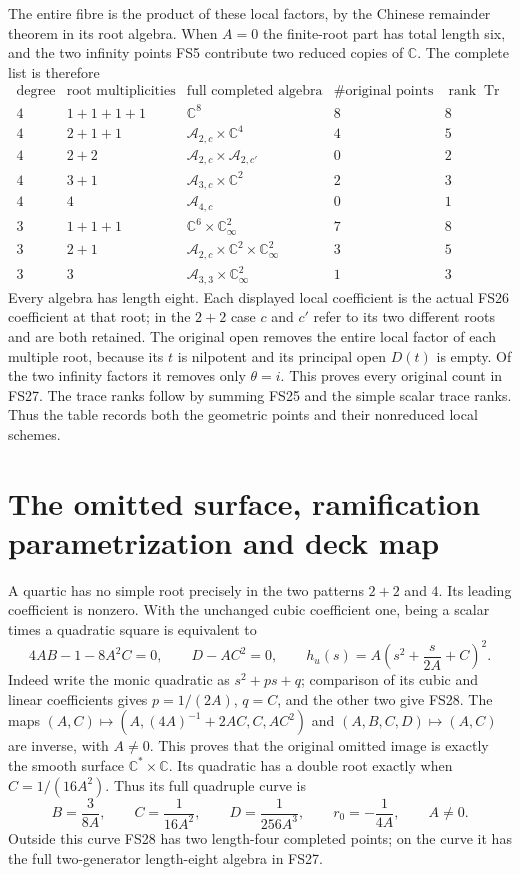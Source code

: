 \documentclass[11pt]{article}
\newcommand{\C}{\mathbb C}
\providecommand{\Tr}{\operatorname{Tr}}
\providecommand{\Tr}{\operatorname{Tr}}
\begin{document}
The entire fibre is the product of these local factors,
by the Chinese remainder theorem in its root algebra.
When $A=0$ the finite-root part has total length six,
and the two infinity points FS5 contribute two reduced
copies of $\C$. The complete list is therefore
\begin{equation}
\begin{array}{c|c|c|c|c}
\text{degree}&\text{root multiplicities}&\text{full completed algebra}
 &\#\text{original points}&\operatorname{rank}\Tr\\\hline
4&1+1+1+1&\C^8&8&8\\
4&2+1+1&\mathcal A_{2,c}\times\C^4&4&5\\
4&2+2&\mathcal A_{2,c}\times\mathcal A_{2,c'}&0&2\\
4&3+1&\mathcal A_{3,c}\times\C^2&2&3\\
4&4&\mathcal A_{4,c}&0&1\\\hline
3&1+1+1&\C^6\times\C^2_\infty&7&8\\
3&2+1&\mathcal A_{2,c}\times\C^2\times\C^2_\infty&3&5\\
3&3&\mathcal A_{3,3}\times\C^2_\infty&1&3
\end{array}
\tag{FS27}
\end{equation}
Every algebra has length eight. Each displayed local
coefficient is the actual FS26 coefficient at that root;
in the $2+2$ case $c$ and $c'$ refer to its two different
roots and are both retained. The original open removes
the entire local factor of each multiple root, because
its $t$ is nilpotent and its principal open $D(t)$ is
empty. Of the two infinity factors it removes only
$\theta=i$. This proves every original count in FS27.
The trace ranks follow by summing FS25 and the simple
scalar trace ranks. Thus the table records both the
geometric points and their nonreduced local schemes.

\section{The omitted surface, ramification parametrization and deck map}
A quartic has no simple root precisely in the two
patterns $2+2$ and $4$. Its leading coefficient is
nonzero. With the unchanged cubic coefficient one,
being a scalar times a quadratic square is equivalent to
\begin{equation}
4AB-1-8A^2C=0,\qquad D-AC^2=0,\qquad
h_u(s)=A\left(s^2+\frac{s}{2A}+C\right)^2 .
\tag{FS28}
\end{equation}
Indeed write the monic quadratic as $s^2+ps+q$;
comparison of its cubic and linear coefficients gives
$p=1/(2A)$, $q=C$, and the other two give FS28.
The maps
$(A,C)\mapsto(A,(4A)^{-1}+2AC,C,AC^2)$ and
$(A,B,C,D)\mapsto(A,C)$ are inverse, with $A\ne0$.
This proves that the original omitted image is exactly
the smooth surface $\C^*\times\C$.
Its quadratic has a double root exactly when
$C=1/(16A^2)$. Thus its full quadruple curve is
\begin{equation}
B=\frac3{8A},\qquad C=\frac1{16A^2},\qquad
D=\frac1{256A^3},\qquad r_0=-\frac1{4A},\qquad A\ne0 .
\tag{FS29}
\end{equation}
Outside this curve FS28 has two length-four completed
points; on the curve it has the full two-generator
length-eight algebra in FS27.
\end{document}
